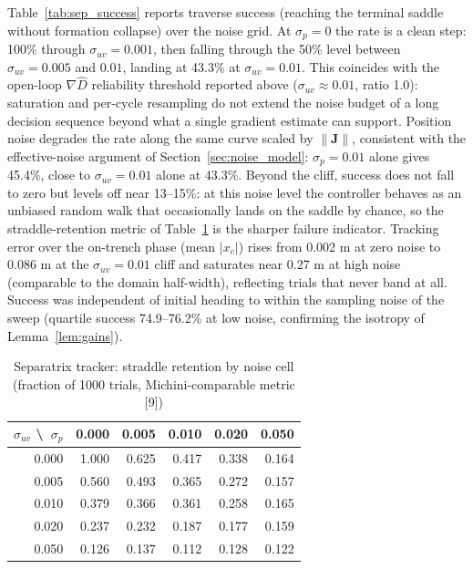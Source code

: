 \documentclass[lettersize,journal]{IEEEtran}
\begin{document}
Table~\ref{tab:sep_success} reports traverse success (reaching the
terminal saddle without formation collapse) over the noise grid. At
$\sigma_p = 0$ the rate is a clean step: 100\% through
$\sigma_{uv} = 0.001$, then falling through the 50\% level between
$\sigma_{uv} = 0.005$ and $0.01$, landing at 43.3\% at
$\sigma_{uv} = 0.01$. This coincides with the open-loop
$\nabla\hat{D}$ reliability threshold reported above
($\sigma_{uv} \approx 0.01$, ratio 1.0): saturation and per-cycle
resampling do not extend the noise budget
of a long decision sequence beyond what a single gradient estimate can
support. Position noise degrades the rate along the same curve scaled
by $\|\mathbf{J}\|$, consistent with the effective-noise argument of
Section~\ref{sec:noise_model}: $\sigma_p = 0.01$ alone gives 45.4\%,
close to $\sigma_{uv} = 0.01$ alone at 43.3\%. Beyond the cliff, success
does not fall to zero but levels off near 13--15\%: at this noise level
the controller behaves as an unbiased random walk that occasionally
lands on the saddle by chance, so the straddle-retention metric of
Table~\ref{tab:sep_straddle} is the sharper failure indicator. Tracking
error over the on-trench phase (mean $|x_c|$) rises from 0.002 m at zero
noise to 0.086 m at the $\sigma_{uv} = 0.01$ cliff and saturates near
0.27 m at high noise (comparable to the domain half-width), reflecting
trials that never band at all. Success was independent of initial
heading to within the sampling noise of the sweep (quartile success
74.9--76.2\% at low noise, confirming the isotropy of
Lemma~\ref{lem:gains}).

\begin{table}[!t]
\centering
\caption{Separatrix tracker: straddle retention by noise cell (fraction
of 1000 trials, Michini-comparable metric [9])}
\label{tab:sep_straddle}
\footnotesize
\setlength{\tabcolsep}{4pt}
\begin{tabular}{r|rrrrr}
\hline
$\sigma_{uv}$ \textbackslash\ $\sigma_p$ & 0.000 & 0.005 & 0.010 & 0.020 & 0.050 \\
\hline
0.000 & 1.000 & 0.625 & 0.417 & 0.338 & 0.164 \\
0.005 & 0.560 & 0.493 & 0.365 & 0.272 & 0.157 \\
0.010 & 0.379 & 0.366 & 0.361 & 0.258 & 0.165 \\
0.020 & 0.237 & 0.232 & 0.187 & 0.177 & 0.159 \\
0.050 & 0.126 & 0.137 & 0.112 & 0.128 & 0.122 \\
\hline
\end{tabular}
\end{table}
\end{document}

